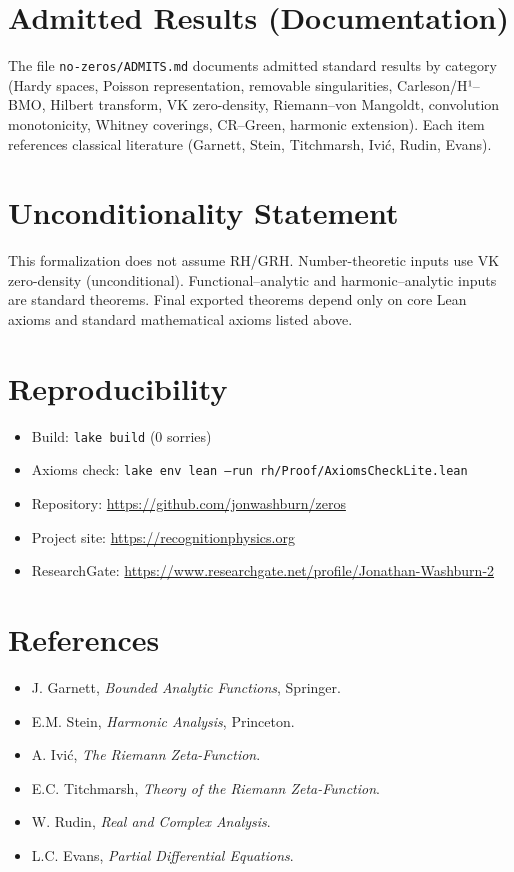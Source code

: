 \documentclass[11pt]{article}
\newcommand{\repo}{\url{https://github.com/jonwashburn/zeros}}
\begin{document}
\section*{Admitted Results (Documentation)}
The file \texttt{no-zeros/ADMITS.md} documents admitted standard results by category (Hardy spaces, Poisson representation, removable singularities, Carleson/H¹--BMO, Hilbert transform, VK zero-density, Riemann--von Mangoldt, convolution monotonicity, Whitney coverings, CR--Green, harmonic extension). Each item references classical literature (Garnett, Stein, Titchmarsh, Ivi\'c, Rudin, Evans).

\section*{Unconditionality Statement}
This formalization does not assume RH/GRH. Number-theoretic inputs use VK zero-density (unconditional). Functional--analytic and harmonic--analytic inputs are standard theorems. Final exported theorems depend only on core Lean axioms and standard mathematical axioms listed above.

\section*{Reproducibility}
\begin{itemize}[leftmargin=*]
  \item Build: \texttt{lake build} (0 sorries)
  \item Axioms check: \texttt{lake env lean --run rh/Proof/AxiomsCheckLite.lean}
  \item Repository: \repo
  \item Project site: \url{https://recognitionphysics.org}
  \item ResearchGate: \url{https://www.researchgate.net/profile/Jonathan-Washburn-2}
\end{itemize}

\section*{References}
\begin{itemize}[leftmargin=*]
  \item J. Garnett, \emph{Bounded Analytic Functions}, Springer.
  \item E.M. Stein, \emph{Harmonic Analysis}, Princeton.
  \item A. Ivi\'c, \emph{The Riemann Zeta-Function}.
  \item E.C. Titchmarsh, \emph{Theory of the Riemann Zeta-Function}.
  \item W. Rudin, \emph{Real and Complex Analysis}.
  \item L.C. Evans, \emph{Partial Differential Equations}.
\end{itemize}
\end{document}
